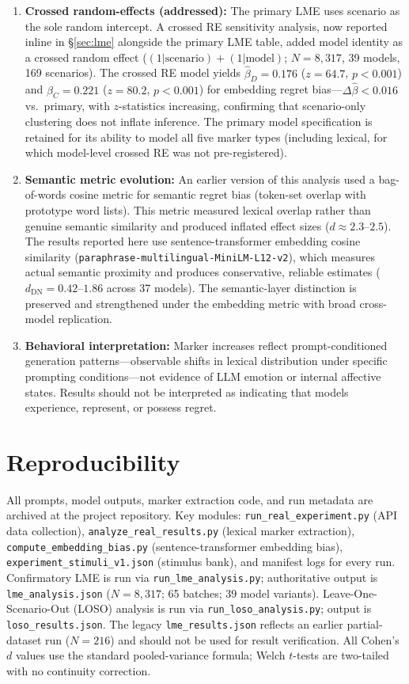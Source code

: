 \documentclass[conference,10pt]{IEEEtran}
\begin{document}
\begin{enumerate}
  \item \textbf{Crossed random-effects (addressed):} The primary LME uses scenario as the sole random intercept. A crossed RE sensitivity analysis, now reported inline in \S\ref{sec:lme} alongside the primary LME table, added model identity as a crossed random effect ($(1|\text{scenario}) + (1|\text{model})$; $N=8{,}317$, 39 models, 169 scenarios). The crossed RE model yields $\hat{\beta}_D=0.176$ ($z=64.7$, $p<0.001$) and $\hat{\beta}_C=0.221$ ($z=80.2$, $p<0.001$) for embedding regret bias---$\Delta\hat{\beta} < 0.016$ vs.\ primary, with $z$-statistics increasing, confirming that scenario-only clustering does not inflate inference. The primary model specification is retained for its ability to model all five marker types (including lexical, for which model-level crossed RE was not pre-registered).
  \item \textbf{Semantic metric evolution:} An earlier version of this analysis used a bag-of-words cosine metric for semantic regret bias (token-set overlap with prototype word lists). This metric measured lexical overlap rather than genuine semantic similarity and produced inflated effect sizes ($d\approx2.3$--$2.5$). The results reported here use sentence-transformer embedding cosine similarity (\texttt{paraphrase-multilingual-MiniLM-L12-v2}), which measures actual semantic proximity and produces conservative, reliable estimates ($d_\text{DN}=0.42$--$1.86$ across 37 models). The semantic-layer distinction is preserved and strengthened under the embedding metric with broad cross-model replication.
  \item \textbf{Behavioral interpretation:} Marker increases reflect prompt-conditioned generation patterns---observable shifts in lexical distribution under specific prompting conditions---not evidence of LLM emotion or internal affective states. Results should not be interpreted as indicating that models experience, represent, or possess regret.
\end{enumerate}

\section{Reproducibility}
All prompts, model outputs, marker extraction code, and run metadata are archived at the project repository.
Key modules: \texttt{run\_real\_experiment.py} (API data collection), \texttt{analyze\_real\_results.py} (lexical marker extraction), \texttt{compute\_embedding\_bias.py} (sentence-transformer embedding bias), \texttt{experiment\_stimuli\_v1.json} (stimulus bank), and manifest logs for every run.
Confirmatory LME is run via \texttt{run\_lme\_analysis.py}; authoritative output is \texttt{lme\_analysis.json} ($N=8{,}317$; 65 batches; 39 model variants). Leave-One-Scenario-Out (LOSO) analysis is run via \texttt{run\_loso\_analysis.py}; output is \texttt{loso\_results.json}.
The legacy \texttt{lme\_results.json} reflects an earlier partial-dataset run ($N=216$) and should not be used for result verification.
All Cohen's $d$ values use the standard pooled-variance formula; Welch $t$-tests are two-tailed with no continuity correction.
\end{document}
